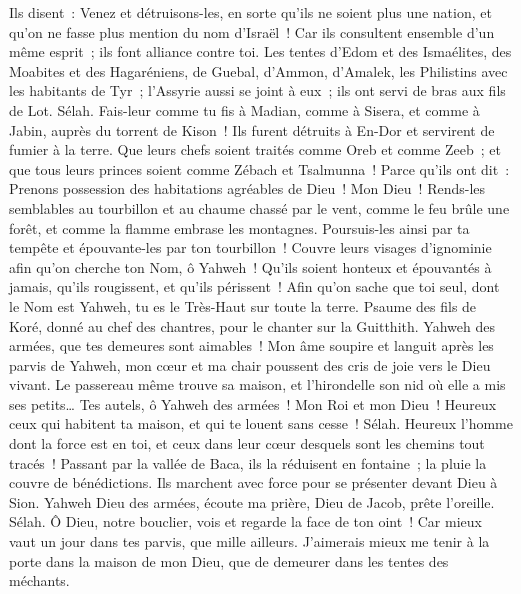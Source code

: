 \begin{multicols}{2}
Ils disent~: Venez et détruisons-les, en sorte qu'ils ne soient plus une nation, et qu'on ne fasse plus mention du nom d'Israël~!
Car ils consultent ensemble d'un même esprit~; ils font alliance contre toi.
Les tentes d'Edom et des Ismaélites, des Moabites et des Hagaréniens,
de Guebal, d'Ammon, d'Amalek, les Philistins avec les habitants de Tyr~;
l'Assyrie aussi se joint à eux~; ils ont servi de bras aux fils de Lot. Sélah.
Fais-leur comme tu fis à Madian, comme à Sisera, et comme à Jabin, auprès du torrent de Kison~!
Ils furent détruits à En-Dor et servirent de fumier à la terre.
Que leurs chefs soient traités comme Oreb et comme Zeeb~; et que tous leurs princes soient comme Zébach et Tsalmunna~!
Parce qu'ils ont dit~: Prenons possession des habitations agréables de Dieu~!
Mon Dieu~! Rends-les semblables au tourbillon et au chaume chassé par le vent,
comme le feu brûle une forêt, et comme la flamme embrase les montagnes.
Poursuis-les ainsi par ta tempête et épouvante-les par ton tourbillon~!
Couvre leurs visages d'ignominie afin qu'on cherche ton Nom, ô Yahweh~!
Qu'ils soient honteux et épouvantés à jamais, qu'ils rougissent, et qu'ils périssent~!
Afin qu'on sache que toi seul, dont le Nom est Yahweh, tu es le Très-Haut sur toute la terre.
\VerseOne{}Psaume des fils de Koré, donné au chef des chantres, pour le chanter sur la Guitthith.
Yahweh des armées, que tes demeures sont aimables~!
Mon âme soupire et languit après les parvis de Yahweh, mon cœur et ma chair poussent des cris de joie vers le Dieu vivant.
Le passereau même trouve sa maison, et l'hirondelle son nid où elle a mis ses petits… Tes autels, ô Yahweh des armées~! Mon Roi et mon Dieu~!
Heureux ceux qui habitent ta maison, et qui te louent sans cesse~! Sélah.
Heureux l'homme dont la force est en toi, et ceux dans leur cœur desquels sont les chemins tout tracés~!
Passant par la vallée de Baca, ils la réduisent en fontaine~; la pluie la couvre de bénédictions.
Ils marchent avec force pour se présenter devant Dieu à Sion.
Yahweh Dieu des armées, écoute ma prière, Dieu de Jacob, prête l'oreille. Sélah.
Ô Dieu, notre bouclier, vois et regarde la face de ton oint~!
Car mieux vaut un jour dans tes parvis, que mille ailleurs. J'aimerais mieux me tenir à la porte dans la maison de mon Dieu, que de demeurer dans les tentes des méchants.

\end{multicols}
